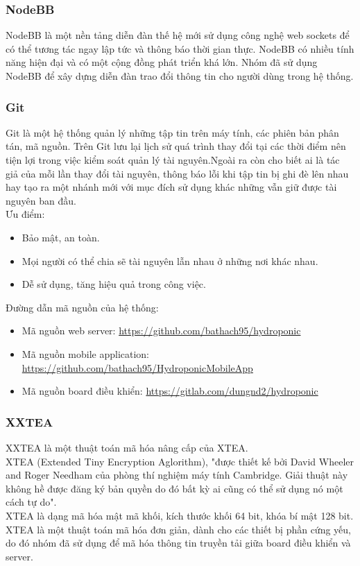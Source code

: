 \documentclass[a4paper,12pt,oneside]{article}
\begin{document}
\subsubsection{NodeBB}
\noindent NodeBB là một nền tảng diễn đàn thế hệ mới sử dụng công nghệ web sockets để có thể tương tác ngay lập tức và thông báo thời gian thực. NodeBB có nhiều tính năng hiện đại và có một cộng đồng phát triển khá lớn. Nhóm đã sử dụng NodeBB để xây dựng diễn đàn trao đổi thông tin cho người dùng trong hệ thống. 

\subsubsection{Git}
\noindent Git là một hệ thống quản lý những tập tin trên máy tính, các phiên bản phân tán, mã nguồn. Trên Git lưu lại lịch sử quá trình thay đổi tại các thời điểm nên tiện lợi trong việc kiểm soát quản lý tài nguyên.Ngoài ra còn cho biết ai là tác giả của mỗi lần thay đổi tài nguyên, thông báo lỗi khi tập tin bị ghi đè lên nhau hay tạo ra một nhánh mới với mục đích sử dụng khác những vẫn giữ được tài nguyên ban đầu.\\ 
Ưu điểm:
\begin{itemize}
\item Bảo mật, an toàn.
\item Mọi người có thể chia sẽ tài nguyên lẫn nhau ở những nơi khác nhau.
\item Dễ sử dụng, tăng hiệu quả trong công việc.
\end{itemize}

Đường dẫn mã nguồn của hệ thống:
\begin{itemize}
\item Mã nguồn web server: \url{https://github.com/bathach95/hydroponic}
\item Mã nguồn mobile application: \url{https://github.com/bathach95/HydroponicMobileApp}
\item Mã nguồn board điều khiển: \url{https://gitlab.com/dungnd2/hydroponic}
\end{itemize}

\subsubsection{XXTEA}
\noindent XXTEA là một thuật toán mã hóa nâng cấp của XTEA.\\
\noindent XTEA (Extended Tiny Encryption Aglorithm), "được thiết kế bởi David Wheeler and Roger Needham của phòng thí nghiệm máy tính Cambridge. Giải thuật này không hề được đăng ký bản quyền do đó bất kỳ ai cũng có thể sử dụng nó một cách tự do"\cite{xxtea}.\\ 
\noindent XTEA là dạng mã hóa mật mã khối, kích thước khối 64 bit, khóa bí mật 128 bit. XTEA là một thuật toán mã hóa đơn giản, dành cho các thiết bị phần cứng yếu, do đó nhóm đã sử dụng để mã hóa thông tin truyền tải giữa board điều khiển và server.
\end{document}
